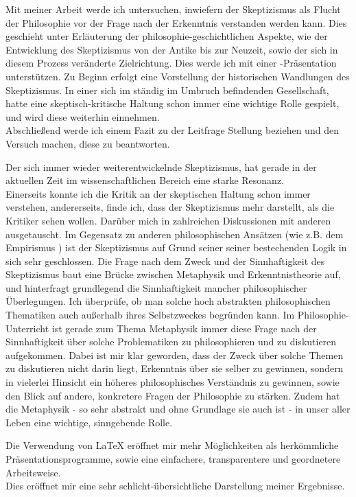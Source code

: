 \documentclass[11pt,a4paper,final]{article}
\begin{document}
Mit meiner Arbeit werde ich untersuchen, inwiefern der Skeptizismus als Flucht der Philosophie vor der Frage nach der Erkenntnis verstanden werden kann. Dies geschieht unter Erläuterung der philosophie-geschichtlichen Aspekte, wie der Entwicklung des Skeptizismus von der Antike bis zur Neuzeit, sowie der sich in diesem Prozess veränderte Zielrichtung. Dies werde ich mit einer %
 -Präsentation unterstützen. Zu Beginn erfolgt eine Vorstellung der historischen Wandlungen des Skeptizismus. In einer sich im ständig im Umbruch befindenden Gesellschaft, hatte eine skeptisch-kritische Haltung schon immer eine wichtige Rolle gespielt, und wird diese weiterhin einnehmen.\\
 Abschließend werde ich einem Fazit zu der Leitfrage Stellung beziehen und den Versuch machen, diese zu beantworten.
 
 Der sich immer wieder weiterentwickelnde Skeptizismus, hat gerade in der aktuellen Zeit im wissenschaftlichen Bereich eine starke Resonanz.\\ %
Einerseits konnte ich die Kritik an der skeptischen Haltung schon immer verstehen, andererseits, finde ich, dass der Skeptizismus mehr darstellt, als die Kritiker sehen wollen. %
Darüber mich in zahlreichen Diskussionen mit anderen ausgetauscht. Im Gegensatz zu anderen philosophischen Ansätzen (wie z.B. dem Empirismus %
) ist der Skeptizismus auf Grund seiner seiner bestechenden Logik in sich sehr geschlossen. Die Frage nach dem Zweck und der Sinnhaftigkeit des Skeptizismus baut eine Brücke zwischen Metaphysik und Erkenntnistheorie auf, und hinterfragt grundlegend die Sinnhaftigkeit mancher philosophischer Überlegungen.%
Ich überprüfe, ob man solche hoch abstrakten philosophischen Thematiken auch außerhalb ihres Selbstzweckes begründen kann.%
Im Philosophie-Unterricht ist gerade zum Thema Metaphysik immer diese Frage nach der Sinnhaftigkeit über solche Problematiken zu philosophieren und zu diskutieren aufgekommen.%
Dabei ist mir klar geworden, dass der Zweck über solche Themen zu diskutieren nicht darin liegt, Erkenntnis über sie selber zu gewinnen, sondern in vielerlei Hinsicht ein höheres philosophisches Verständnis zu gewinnen, sowie den Blick auf andere, konkretere Fragen der Philosophie zu stärken. Zudem hat die Metaphysik - so sehr abstrakt und ohne Grundlage sie auch ist - in unser aller Leben eine wichtige, sinngebende Rolle.

Die Verwendung von LaTeX eröffnet mir mehr Möglichkeiten als herkömmliche \\
Präsentationsprogramme, sowie eine einfachere, transparentere und geordnetere Arbeitsweise.\\
Dies eröffnet mir eine sehr schlicht-übersichtliche Darstellung meiner Ergebnisse.\\
\end{document}
